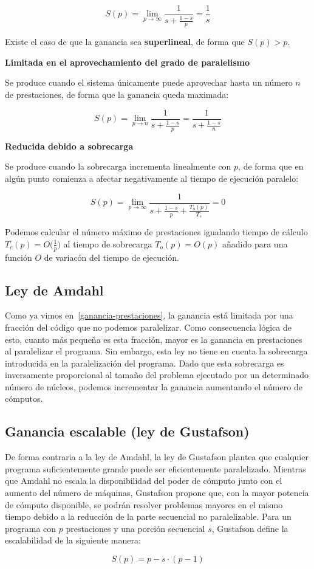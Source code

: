\[S(p)=\lim_{p\to\infty}\frac{1}{s+\frac{1-s}{p}}=\frac{1}{s}\]

Existe el caso de que la ganancia sea \textbf{superlineal}, de forma que $S(p)>p$.

\textbf{Limitada en el aprovechamiento del grado de paralelismo}

Se produce cuando el sistema únicamente puede aprovechar hasta un número $n$ de prestaciones, de forma que la ganancia queda maximada:

\[S(p)=\lim_{p\to n}\frac{1}{s+\frac{1-s}{p}}=\frac{1}{s+\frac{1-s}{n}}\]

\textbf{Reducida debido a sobrecarga}

Se produce cuando la sobrecarga incrementa linealmente con $p$, de forma que en algún punto comienza a afectar negativamente al tiempo de ejecución paralelo:

\[S(p)=\lim_{p\to\infty}\frac{1}{s+\frac{1-s}{p}+\frac{T_o(p)}{T_s}}=0\]

Podemos calcular el número máximo de prestaciones igualando tiempo de cálculo $T_c(p)=O\big(\frac{1}{p}\big)$ al tiempo de sobrecarga $T_o(p)=O(p)$ añadido para una función $O$ de variacón del tiempo de ejecución.

\subsection{Ley de Amdahl}\label{amdahl-prestaciones}

Como ya vimos en~\ref{ganancia-prestaciones}, la ganancia está limitada por una fracción del código que no podemos paralelizar.
Como consecuencia lógica de esto, cuanto más pequeña es esta fracción, mayor es la ganancia en prestaciones al paralelizar el programa.
Sin embargo, esta ley no tiene en cuenta la sobrecarga introducida en la paralelización del programa.
Dado que esta sobrecarga es inversamente proporcional al tamaño del problema ejecutado por un determinado número de núcleos, podemos incrementar la ganancia aumentando el número de cómputos.

\subsection{Ganancia escalable (ley de Gustafson)}\label{gustafson}

De forma contraria a la ley de Amdahl, la ley de Gustafson plantea que cualquier programa suficientemente grande puede ser eficientemente paralelizado.
Mientras que Amdahl no escala la disponibilidad del poder de cómputo junto con el aumento del número de máquinas, Gustafson propone que, con la mayor potencia de cómputo disponible, se podrán resolver problemas mayores en el mismo tiempo debido a la reducción de la parte secuencial no paralelizable.
Para un programa con $p$ prestaciones y una porción secuencial $s$, Gustafson define la escalabilidad de la siguiente manera:

\[S(p)=p-s\cdot(p-1)\]

